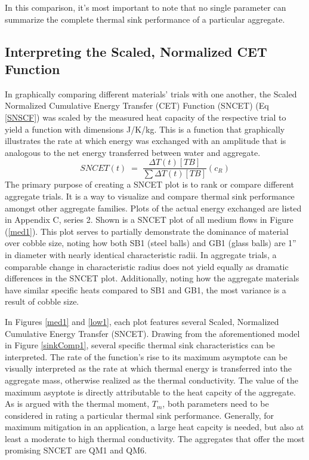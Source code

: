 In this comparison, it's most important to note that no single parameter can summarize the complete thermal sink performance of a particular aggregate.

\subsection{Interpreting the Scaled, Normalized CET Function}
In graphically comparing different materials' trials with one another, the Scaled Normalized Cumulative Energy Transfer (CET) Function (SNCET) (Eq \ref{SNSCF}) was scaled by the measured heat capacity of the respective trial to yield a function with dimensions J/K/kg. This is a function that graphically illustrates the rate at which energy was exchanged with an amplitude that is analogous to the net energy transferred between water and aggregate. 
\begin{equation}\label{SNCSF}
 SNCET(t)\;=\;\dfrac{\Delta T(t)[TB]}{\sum\Delta T(t)[TB]}(c_{R})
\end{equation}
The primary purpose of creating a SNCET plot is to rank or compare different aggregate trials. It is a way to visualize and compare thermal sink performance amongst other aggregate families. Plots of the actual energy exchanged are listed in Appendix C, series 2. Shown is a SNCET plot of all medium flows in Figure (\ref{med1}). This plot serves to partially demonstrate the dominance of material over cobble size, noting how both SB1 (steel balls) and GB1 (glass balls) are 1'' in diameter with nearly identical characteristic radii. In aggregate trials, a comparable change in characteristic radius does not yield equally as dramatic differences in the SNCET plot. Additionally, noting how the aggregate materials have similar specific heats compared to SB1 and GB1, the most variance is a result of cobble size. 

In Figures \ref{med1} and \ref{low1}, each plot features several Scaled, Normalized Cumulative Energy Transfer (SNCET). Drawing from the aforementioned model in Figure \ref{sinkComp1}, several specific thermal sink characteristics can be interpreted. The rate of the function's rise to its maximum asymptote can be visually interpreted as the rate at which thermal energy is transferred into the aggregate mass, otherwise realized as the thermal conductivity. The value of the maximum asyptote is directly attributable to the heat capcity of the aggregate. As is argued with the thermal moment, $T_m$, both parameters need to be considered in rating a particular thermal sink performance. Generally, for maximum mitigation in an application, a large heat capcity is needed, but also at least a moderate to high thermal conductivity. The aggregates that offer the most promising SNCET are QM1 and QM6. 

